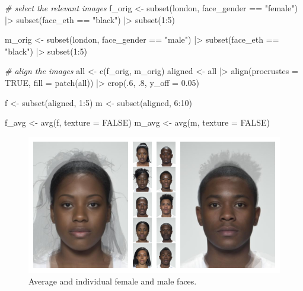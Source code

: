 \documentclass[
  doc,floatsintext]{apa6}
\newenvironment{Shaded}{\begin{snugshade}}{\end{snugshade}}
\newcommand{\AttributeTok}[1]{\textcolor[rgb]{0.77,0.63,0.00}{#1}}
\newcommand{\CommentTok}[1]{\textcolor[rgb]{0.56,0.35,0.01}{\textit{#1}}}
\newcommand{\ConstantTok}[1]{\textcolor[rgb]{0.00,0.00,0.00}{#1}}
\newcommand{\DecValTok}[1]{\textcolor[rgb]{0.00,0.00,0.81}{#1}}
\newcommand{\FloatTok}[1]{\textcolor[rgb]{0.00,0.00,0.81}{#1}}
\newcommand{\FunctionTok}[1]{\textcolor[rgb]{0.00,0.00,0.00}{#1}}
\newcommand{\NormalTok}[1]{#1}
\newcommand{\OtherTok}[1]{\textcolor[rgb]{0.56,0.35,0.01}{#1}}
\newcommand{\SpecialCharTok}[1]{\textcolor[rgb]{0.00,0.00,0.00}{#1}}
\newcommand{\StringTok}[1]{\textcolor[rgb]{0.31,0.60,0.02}{#1}}
\begin{document}
\begin{Shaded}
\begin{Highlighting}[]
\CommentTok{\# select the relevant images}
\NormalTok{f\_orig }\OtherTok{\textless{}{-}} \FunctionTok{subset}\NormalTok{(london, face\_gender }\SpecialCharTok{==} \StringTok{"female"}\NormalTok{) }\SpecialCharTok{|\textgreater{}} 
  \FunctionTok{subset}\NormalTok{(face\_eth }\SpecialCharTok{==} \StringTok{"black"}\NormalTok{) }\SpecialCharTok{|\textgreater{}} \FunctionTok{subset}\NormalTok{(}\DecValTok{1}\SpecialCharTok{:}\DecValTok{5}\NormalTok{)}

\NormalTok{m\_orig }\OtherTok{\textless{}{-}} \FunctionTok{subset}\NormalTok{(london, face\_gender }\SpecialCharTok{==} \StringTok{"male"}\NormalTok{) }\SpecialCharTok{|\textgreater{}} 
  \FunctionTok{subset}\NormalTok{(face\_eth }\SpecialCharTok{==} \StringTok{"black"}\NormalTok{) }\SpecialCharTok{|\textgreater{}} \FunctionTok{subset}\NormalTok{(}\DecValTok{1}\SpecialCharTok{:}\DecValTok{5}\NormalTok{)}

\CommentTok{\# align the images}
\NormalTok{all }\OtherTok{\textless{}{-}} \FunctionTok{c}\NormalTok{(f\_orig, m\_orig) }
\NormalTok{aligned }\OtherTok{\textless{}{-}}\NormalTok{ all }\SpecialCharTok{|\textgreater{}}
  \FunctionTok{align}\NormalTok{(}\AttributeTok{procrustes =} \ConstantTok{TRUE}\NormalTok{, }\AttributeTok{fill =} \FunctionTok{patch}\NormalTok{(all)) }\SpecialCharTok{|\textgreater{}}
  \FunctionTok{crop}\NormalTok{(.}\DecValTok{6}\NormalTok{, .}\DecValTok{8}\NormalTok{, }\AttributeTok{y\_off =} \FloatTok{0.05}\NormalTok{)}

\NormalTok{f }\OtherTok{\textless{}{-}} \FunctionTok{subset}\NormalTok{(aligned, }\DecValTok{1}\SpecialCharTok{:}\DecValTok{5}\NormalTok{)}
\NormalTok{m }\OtherTok{\textless{}{-}} \FunctionTok{subset}\NormalTok{(aligned, }\DecValTok{6}\SpecialCharTok{:}\DecValTok{10}\NormalTok{)}

\NormalTok{f\_avg }\OtherTok{\textless{}{-}} \FunctionTok{avg}\NormalTok{(f, }\AttributeTok{texture =} \ConstantTok{FALSE}\NormalTok{)}
\NormalTok{m\_avg }\OtherTok{\textless{}{-}} \FunctionTok{avg}\NormalTok{(m, }\AttributeTok{texture =} \ConstantTok{FALSE}\NormalTok{)}
\end{Highlighting}
\end{Shaded}

\begin{figure}
\includegraphics[width=1\linewidth]{index_files/figure-latex/sexdim-avg-1} \caption{Average and individual female and male faces.}\label{fig:sexdim-avg}
\end{figure}
\end{document}

